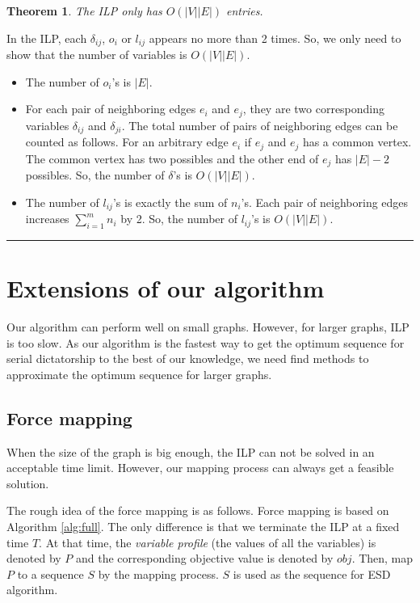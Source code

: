 \documentclass[letterpaper]{article}
\newtheorem{theorem}{Theorem}%
\newenvironment{proof}{{Proof:}}{\hfill\rule{2mm}{2mm}}
\begin{document}
\begin{theorem}
	The ILP only has $O(|V||E|)$ entries.
\end{theorem}
\begin{proof}
	In the ILP, each $\delta_{ij}$, $o_i$ or $l_{ij}$  appears no more than 2 times.
	So, we only need to show that the number of variables is $O(|V||E|)$.
	\begin{itemize}
		\item The number of $o_i$'s is $|E|$.
		\item For each pair of neighboring edges $e_i$ and $e_j$, they are two corresponding variables $\delta_{ij}$ and $\delta_{ji}$. The total number of pairs of neighboring edges can be counted as follows. For an arbitrary edge $e_i$ if $e_j$ and $e_j$ has a common vertex. The common vertex has two possibles and the other end of $e_j$ has $|E|-2$ possibles. So, the number of $\delta$'s is $O(|V||E|)$.
		\item The number of $l_{ij}$'s is exactly the sum of $n_i$'s. Each pair of neighboring edges increases $\sum_{i=1}^m n_i$ by 2. So, the number of $l_{ij}$'s is $O(|V||E|)$.
	\end{itemize}
\end{proof}

\section{Extensions of our algorithm}
Our algorithm can perform well on small graphs.
However, for larger graphs, ILP is too slow.
As our algorithm is the fastest way to get the optimum sequence for serial dictatorship to the best of our knowledge, we need find methods to approximate the optimum sequence for larger graphs.

\subsection{Force mapping}
When the size of the graph is big enough, the ILP can not be solved in an acceptable time limit.
However, our mapping process can always get a feasible solution.

The rough idea of the force mapping is as follows.
Force mapping is based on Algorithm \ref{alg:full}.
The only difference is that we terminate the ILP at a fixed time $T$.
At that time, the \textit{variable profile} (the values of all the variables) is denoted by $P$ and the corresponding objective value is denoted by $obj$.
Then, map $P$ to a sequence $S$ by the mapping process.
$S$ is used as the sequence for ESD algorithm.
\end{document}
